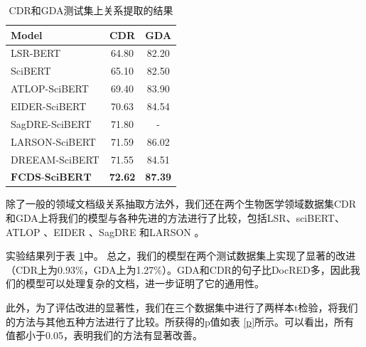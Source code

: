 \documentclass[bachelor]{thesis-uestc}
\begin{document}
\begin{table}[]
    \caption{CDR和GDA测试集上关系提取的结果}
    \centering 
    \begin{tabular}{lcc}
    \hline
    Model          & CDR            & GDA            \\ \hline
    LSR-BERT\cite{nan-etal-2020-reasoning}       & 64.80           & 82.20           \\
    SciBERT\cite{zhou2021document}        & 65.10           & 82.50           \\
    ATLOP-SciBERT\cite{zhou2021document}  & 69.40           & 83.90           \\
    EIDER-SciBERT\cite{xie2022eider}  & 70.63          & 84.54          \\
    SagDRE-SciBERT\cite{SagDRE} & 71.80          & -              \\ 
    LARSON-SciBERT\cite{duan-etal-2022-just} & 71.59          & 86.02              \\ 
    DREEAM-SciBERT\cite{ma-etal-2023-DREEAM} & 71.55          & 84.51              \\ 
    $\mathrm{\textbf{FCDS-SciBERT}}$           & \textbf{72.62} & \textbf{87.39} \\ \hline
    \end{tabular}
    \label{CDR_GDA}
\end{table}

除了一般的领域文档级关系抽取方法外，我们还在两个生物医学领域数据集CDR和GDA上将我们的模型与各种先进的方法进行了比较，包括LSR\cite{nan-etal-2020-reasoning}、sciBERT\cite{zhou2021document}、ATLOP \cite{zhou2021document}、EIDER \cite{xie2022eider}、SagDRE \cite{SagDRE}和LARSON \cite{duan-etal-2022-just}。\par
实验结果列于表 \ref{CDR_GDA}中。
总之，我们的模型在两个测试数据集上实现了显著的改进（CDR上为0.93\%，GDA上为1.27\%）。GDA和CDR的句子比DocRED多，因此我们的模型可以处理复杂的文档，进一步证明了它的通用性。 \par
此外，为了评估改进的显著性，我们在三个数据集中进行了两样本t检验，将我们的方法与其他五种方法进行了比较。所获得的p值如表 \ref{p}所示。可以看出，所有值都小于0.05，表明我们的方法有显著改善。
\end{document}
